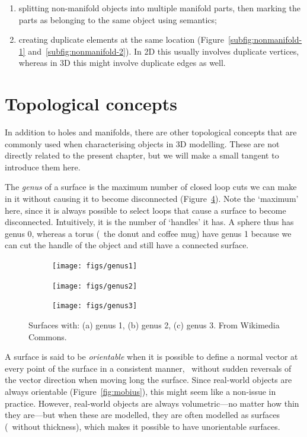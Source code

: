 \begin{enumerate}
	\item splitting non-manifold objects into multiple manifold parts, then marking the parts as belonging to the same object using semantics;
	\item creating duplicate elements at the same location (Figure~\ref{subfig:nonmanifold-1} and~\ref{subfig:nonmanifold-2}).
		In 2D this usually involves duplicate vertices, whereas in 3D this might involve duplicate edges as well.
\end{enumerate}

\section{Topological concepts}

In addition to holes and manifolds, there are other topological concepts that are commonly used when characterising objects in 3D modelling.
These are not directly related to the present chapter, but we will make a small tangent to introduce them here.

The \emph{genus} of a surface is the maximum number of closed loop cuts we can make in it without causing it to become disconnected (Figure~\ref{fig:genus}).
Note the `maximum' here, since it is always possible to select loops that cause a surface to become disconnected.
Intuitively, it is the number of `handles' it has.
A sphere thus has genus 0, whereas a torus (\eg\ the donut and coffee mug) have genus 1 because we can cut the handle of the object and still have a connected surface.

\begin{figure}
\centering
\begin{subfigure}[b]{0.3\linewidth}
\texttt{[image: figs/genus1]}
\caption{}%
\label{subfig:genus1}
\end{subfigure}
\quad
\begin{subfigure}[b]{0.3\linewidth}
\texttt{[image: figs/genus2]}
\caption{}%
\label{subfig:genus2}
\end{subfigure}
\quad
\begin{subfigure}[b]{0.3\linewidth}
\texttt{[image: figs/genus3]}
\caption{}%
\label{subfig:genus3}
\end{subfigure}
\caption[Surfaces with different genus]{Surfaces with: (a) genus 1, (b) genus 2, (c) genus 3. From Wikimedia Commons.}%
\label{fig:genus}
\end{figure}

A surface is said to be \emph{orientable} when it is possible to define a normal vector at every point of the surface in a consistent manner, \ie\ without sudden reversals of the vector direction when moving long the surface.
Since real-world objects are always orientable (Figure~\ref{fig:mobius}), this might seem like a non-issue in practice.
However, real-world objects are always volumetric---no matter how thin they are---but when these are modelled, they are often modelled as surfaces (\ie\ without thickness), which makes it possible to have unorientable surfaces.

